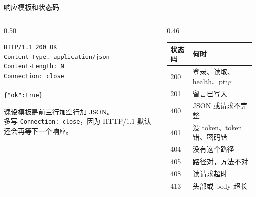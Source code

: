 \documentclass[aspectratio=169,11pt,professionalfonts]{ctexbeamer}
\begin{document}
\begin{frame}[fragile]{响应模板和状态码}
\begin{columns}[T,onlytextwidth]
\begin{column}{0.50\textwidth}
\begin{lstlisting}[style=plain]
HTTP/1.1 200 OK
Content-Type: application/json
Content-Length: N
Connection: close

{"ok":true}
\end{lstlisting}
{\scriptsize 课设模板是前三行加空行加 JSON。\\多写 \texttt{Connection: close}，因为 HTTP/1.1 默认还会再等下一个响应。}
\end{column}
\begin{column}{0.46\textwidth}
{\footnotesize
\begin{tabular}{@{}ll@{}}
\toprule
状态码 & 何时 \\
\midrule
200 & 登录、读取、health、ping \\
201 & 留言已写入 \\
400 & JSON 或请求不完整 \\
401 & 没 token、token 错、密码错 \\
404 & 没有这个路径 \\
405 & 路径对，方法不对 \\
408 & 读请求超时 \\
413 & 头部或 body 超长 \\
\bottomrule
\end{tabular}
}
\end{column}
\end{columns}
\end{frame}
\end{document}
